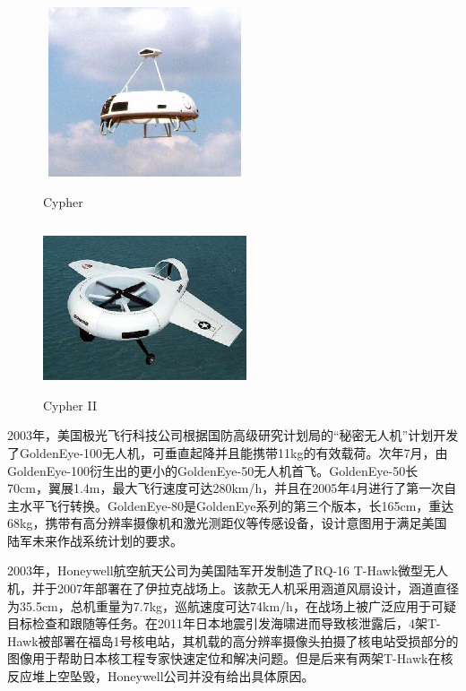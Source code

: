 \begin{figure}[htbp]
	\centering
	\begin{minipage}[c]{0.5\textwidth} %
		\centering
		\includegraphics[width=6cm,height=5cm]{Fig/Cypher.jpg}
		\caption{\label{Cypher}Cypher}
	\end{minipage}%
	\begin{minipage}[c]{0.5\textwidth}
		\centering
		\includegraphics[width=6cm,height=5cm]{Fig/Cypher II.png}
		\caption{\label{Cypher II}Cypher II}
	\end{minipage}
\end{figure}

2003年，美国极光飞行科技公司根据国防高级研究计划局的“秘密无人机”计划开发了GoldenEye-100无人机，可垂直起降并且能携带11kg的有效载荷。次年7月，由GoldenEye-100衍生出的更小的GoldenEye-50无人机首飞。GoldenEye-50长70cm，翼展1.4m，最大飞行速度可达280km/h\cite{schaeferGoldenEyeClandestineUAV}，并且在2005年4月进行了第一次自主水平飞行转换。GoldenEye-80是GoldenEye系列的第三个版本，长165cm，重达68kg，携带有高分辨率摄像机和激光测距仪等传感设备，设计意图用于满足美国陆军未来作战系统计划的要求。

2003年，Honeywell航空航天公司为美国陆军开发制造了RQ-16 T-Hawk微型无人机，并于2007年部署在了伊拉克战场上\cite{white2010upgrades}。该款无人机采用涵道风扇设计，涵道直径为35.5cm，总机重量为7.7kg，巡航速度可达74km/h，在战场上被广泛应用于可疑目标检查和跟随等任务。在2011年日本地震引发海啸进而导致核泄露后，4架T-Hawk被部署在福岛1号核电站，其机载的高分辨率摄像头拍摄了核电站受损部分的图像用于帮助日本核工程专家快速定位和解决问题。但是后来有两架T-Hawk在核反应堆上空坠毁，Honeywell公司并没有给出具体原因。

